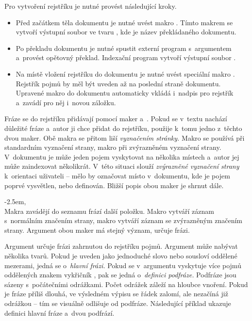 \documentclass[12pt]{article}
\begin{document}
\bigskip
Pro vytvoření rejstříku je nutné provést následující kroky.
\begin{itemize}
\item
  Před začátkem těla dokumentu je nutné uvést makro .
  Tímto makrem se vytvoří výstupní soubor ve tvaru ,
  kde  je název překládaného dokumentu.
\item
  Po překladu dokumentu je nutné spustit externí program  
  s~argumentem  a~provést opětovný překlad. Indexační
  program vytvoří výstupní soubor .
\item
  Na místě vložení rejstříku do dokumentu je nutné uvést speciální makro 
  . Rejstřík pojmů by měl být uveden až na poslední
  straně dokumentu. Upravené makro  do dokumentu 
  automaticky vkládá i~nadpis pro rejstřík a~zavádí pro něj i~novou záložku.
\end{itemize}

Fráze se do rejstříku přidávají pomocí maker  a~. Pokud se
v~textu nachází důležité fráze a~autor ji chce přidat do rejstříku, použije
k~tomu jedno z~těchto dvou maker. 
Obě makra se přitom liší \emph{vyznačením stránky.}
Makro  se používá při standardním vyznačení strany, makro 
při zvýrazněném vyznačení strany. V~dokumentu je může jeden pojem vyskytovat
na několika místech a~autor jej může zaindexovat několikrát. V~této situaci
slouží \emph{zvýrazněné vyznačení strany}
k~orientaci uživateli -- mělo by označovat místo v~dokumentu, kde je pojem
poprvé vysvětlen, nebo definován. Bližší popis obou maker je shrnut dále.

\medskip\bgroup
\noindent%
%
\addtolength{\leftskip}{2.5em}\parindent=0pt
\null \kern-2.5em,
 \\[2pt]
Makra zavádějí do seznamu frází další položku. Makro  vytváří záznam
s~normálním značením strany, makro  vytváří záznam se zvýrazněným
značením strany. Argument obou maker má stejný význam, určuje frázi.

\smallskip
Argument 
určuje frázi zahrnutou do rejstříku pojmů.
Argument může nabývat několika tvarů. Pokud je uveden jako jednoduché slovo 
nebo sousloví oddělené mezerami, 
jedná se o~\emph{hlavní frázi.} 
Pokud se v~argumentu vyskytuje více pojmů oddělených znakem vykřičník 
, pak se jedná 
o~\emph{definici podfráze.} 
Podfráze jsou sázeny s~počátečními odrážkami.
Počet odrážek záleží na hloubce vnoření.
Pokud je fráze příliš dlouhá, ve výsledném výpisu se řádek zalomí, 
ale nezačíná již odrážkou -- tím se visuálně odlišuje od podfráze.
Následující příklad ukazuje definici hlavní fráze a~dvou podfrází.
\end{document}
